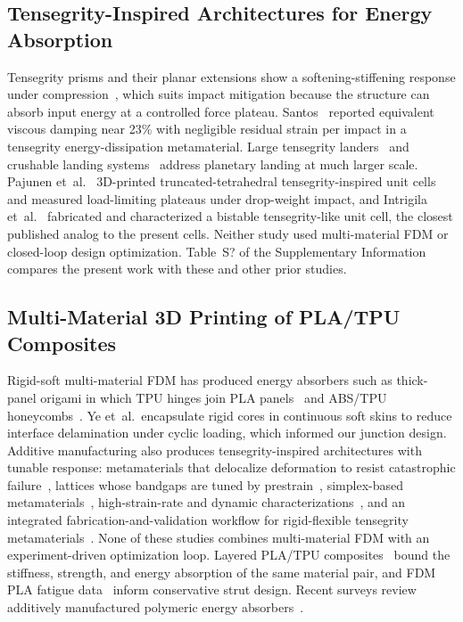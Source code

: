 \documentclass[11pt]{article}
\providecommand{\siref}[1]{S?}
\begin{document}
\subsection{Tensegrity-Inspired Architectures for Energy Absorption}

Tensegrity prisms and their planar extensions show a softening-stiffening
response under compression~\citep{amendola2014experimental,
zhang2018tensegrity, fraternali2015tensegrity}, which suits impact
mitigation because the structure can absorb input energy at a controlled
force plateau. Santos~\cite{santos2023towardanovel} reported equivalent
viscous damping near 23\% with negligible residual strain per impact in a
tensegrity energy-dissipation metamaterial. Large tensegrity
landers~\citep{agogino2018superball, caluwaerts2014superball,
sabelhaus2015system, vespignani2018design, deitrich2022titan} and
crushable landing systems~\citep{cloutier1966landing,
adams2004merairbag, jackson2014honeycomb} address planetary landing at
much larger scale. Pajunen et~al.~\cite{pajunen2019design} 3D-printed
truncated-tetrahedral tensegrity-inspired unit cells and measured
load-limiting plateaus under drop-weight impact, and Intrigila
et~al.~\cite{intrigila2022fabricationandexperimental} fabricated and
characterized a bistable tensegrity-like unit cell, the closest published
analog to the present cells. Neither study used multi-material FDM or
closed-loop design optimization. Table~\siref{tab:si-novelty} of the
Supplementary Information compares the present work with these and
other prior studies.

\subsection{Multi-Material 3D Printing of PLA/TPU Composites}

Rigid-soft multi-material FDM has produced energy absorbers such as
thick-panel origami in which TPU hinges join PLA
panels~\cite{ye2023multimaterial} and ABS/TPU
honeycombs~\cite{khatri2024energy}. Ye et~al.\ encapsulate rigid cores
in continuous soft skins to reduce interface delamination under cyclic
loading, which informed our junction design. Additive manufacturing also
produces tensegrity-inspired architectures with tunable response:
metamaterials that delocalize deformation to resist catastrophic
failure~\cite{bauer2021tensegrity}, lattices whose bandgaps are tuned
by prestrain~\cite{pajunen2021prestrain}, simplex-based
metamaterials~\cite{sabounizawadzka2024experimental}, high-strain-rate
and dynamic characterizations~\cite{almeida2025highstrainrate,
davami2025dynamicanalysis}, and an integrated fabrication-and-validation
workflow for rigid-flexible tensegrity
metamaterials~\cite{wang2026integrated}. None of these studies combines
multi-material FDM with an experiment-driven optimization loop. Layered
PLA/TPU composites~\citep{arifvianto2022mechanicalpropertiesof} bound
the stiffness, strength, and energy absorption of the same material
pair, and FDM PLA fatigue data~\citep{ezeh2018onthefatigue,
vanaei2021multiscaledamageanalysis} inform conservative strut design.
Recent surveys review additively manufactured polymeric energy
absorbers~\citep{bustihan2026recentadvancesin,
liu2026threedimensionalprintedlattice}.
\end{document}
